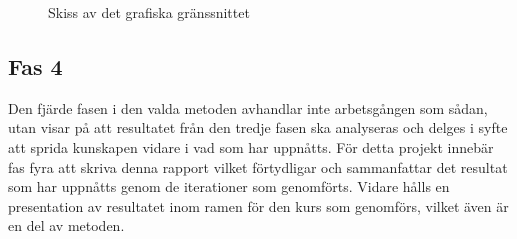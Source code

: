             \begin{figure}[hb]
                
            \caption{\label{fig:app_skiss} Skiss av det grafiska gränssnittet}
            \end{figure}



    \subsection{Fas 4} %
    \label{sub:fas_4}
        Den fjärde fasen i den valda metoden avhandlar inte arbetsgången som sådan, utan visar på att resultatet från den tredje fasen ska analyseras och delges i syfte att sprida kunskapen vidare i vad som har uppnåtts. 
        För detta projekt innebär fas fyra att skriva denna rapport vilket förtydligar och sammanfattar det resultat som har uppnåtts genom de iterationer som genomförts. Vidare hålls en presentation av resultatet inom ramen för den kurs som genomförs, vilket även är en del av metoden.
